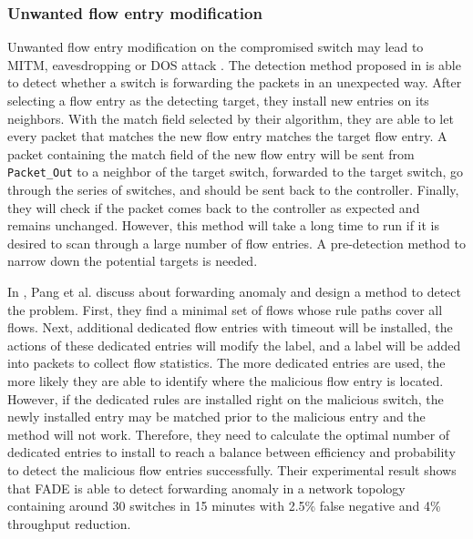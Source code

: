 \documentclass[conference]{IEEEtran}
\begin{document}
\subsubsection{Unwanted flow entry modification}
Unwanted flow entry modification on the compromised switch may lead to MITM, eavesdropping or DOS attack \cite{AAS14}. The detection method proposed in \cite{CKGL15} is able to detect whether a switch is forwarding the packets in an unexpected way. After selecting a flow entry as the detecting target, they install new entries on its neighbors. With the match field selected by their algorithm, they are able to let every packet that matches the new flow entry matches the target flow entry. A packet containing the match field of the new flow entry will be sent from \texttt{Packet\_Out} to a neighbor of the target switch, forwarded to the target switch, go through the series of switches, and should be sent back to the controller. Finally, they will check if the packet comes back to the controller as expected and remains unchanged. However, this method will take a long time to run if it is desired to scan through a large number of flow entries. A pre-detection method to narrow down the potential targets is needed.

In \cite{PJL16}, Pang et al. discuss about forwarding anomaly and design a method to detect the problem. First, they find a minimal set of flows whose rule paths cover all flows. Next, additional dedicated flow entries with timeout will be installed, the actions of these dedicated entries will modify the label, and a label will be added into packets to collect flow statistics. The more dedicated entries are used, the more likely they are able to identify where the malicious flow entry is located. However, if the dedicated rules are installed right on the malicious switch, the newly installed entry may be matched prior to the malicious entry and the method will not work. Therefore, they need to calculate the optimal number of dedicated entries to install to reach a balance between efficiency and probability to detect the malicious flow entries successfully. Their experimental result shows that FADE is able to detect forwarding anomaly in a network topology containing around 30 switches in 15 minutes with 2.5\% false negative and 4\% throughput reduction.
\end{document}

